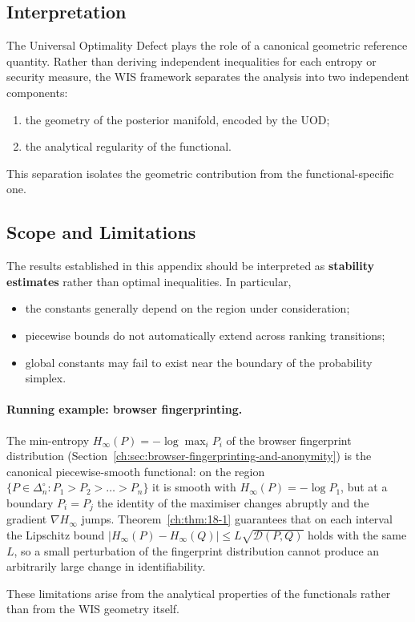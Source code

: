 \subsection{Interpretation}\label{ch:sec:interpretation-piecewise_smooth}
The Universal Optimality Defect plays the role of a canonical geometric
reference quantity.
Rather than deriving independent inequalities for each entropy or
security measure, the WIS framework separates the analysis into two
independent components:
\begin{enumerate}
\item the geometry of the posterior manifold, encoded by the UOD;
\item the analytical regularity of the functional.
\end{enumerate}
This separation isolates the geometric contribution from the
functional-specific one.


\subsection{Scope and Limitations}\label{ch:sec:scope-and-limitations}
The results established in this appendix should be interpreted as
\textbf{stability estimates} rather than optimal inequalities.
In particular,
\begin{itemize}
\item the constants generally depend on the region under consideration;
\item piecewise bounds do not automatically extend across ranking transitions;
\item global constants may fail to exist near the boundary of the probability simplex.
\end{itemize}
\paragraph{Running example: browser fingerprinting.}
The min-entropy $H_\infty(P)=-\log\max_i P_i$ of the browser fingerprint distribution (Section~\ref{ch:sec:browser-fingerprinting-and-anonymity}) is the canonical piecewise-smooth functional: on the region $\{P\in\Delta_n^\circ:P_1>P_2>\dots>P_n\}$ it is smooth with $H_\infty(P)=-\log P_1$, but at a boundary $P_i=P_j$ the identity of the maximiser changes abruptly and the gradient $\nabla H_\infty$ jumps.  Theorem~\ref{ch:thm:18-1} guarantees that on each interval the Lipschitz bound $|H_\infty(P)-H_\infty(Q)|\le L\sqrt{\mathcal D(P,Q)}$ holds with the same $L$, so a small perturbation of the fingerprint distribution cannot produce an arbitrarily large change in identifiability.

These limitations arise from the analytical properties of the
functionals rather than from the WIS geometry itself.
